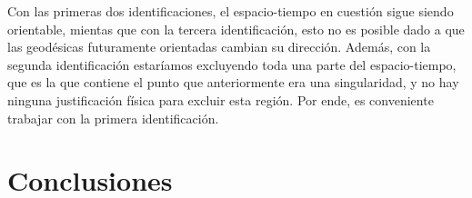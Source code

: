 \documentclass[16pt,a4paper]{article}
\numberwithin{equation}{section}
\theoremstyle{definition}
\begin{document}
Con las primeras dos identificaciones, el espacio-tiempo en cuestión sigue siendo orientable, mientas que con la tercera identificación, esto no es posible dado a que las geodésicas  futuramente orientadas cambian su dirección. Además, con la segunda identificación estaríamos excluyendo toda una parte del espacio-tiempo, que es la que contiene el punto que anteriormente era una singularidad, y no hay ninguna justificación física para excluir esta región. Por ende, es conveniente trabajar con la primera identificación.
\newpage
\section{\label{conclusions} Conclusiones}

\newpage


\end{document}
